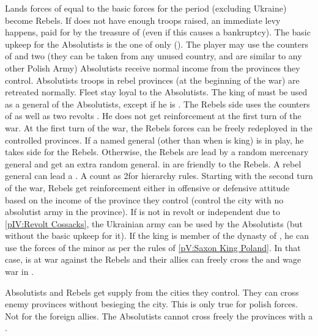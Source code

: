 \phadm
\aparag Lands forces of \POL equal to the basic forces for the period
(excluding Ukraine) become Rebels.
\bparag If \POL does not have enough troops raised, an immediate levy happens,
paid for by the treasure of \POL (even if this causes a bankruptcy).
\aparag The basic upkeep for the Absolutists is the one of \paysPologne only
(\ARMY\faceplus).
\bparag The player may use the counters of \paysPologne and two \ARMY (they
can be taken from any unused country, and are similar to any other Polish
Army)
\bparag Absolutists receive normal income from the provinces they control.
\bparag Absolutists troops in rebel provinces (at the beginning of the war)
are retreated normally.
\bparag Fleet stay loyal to the Absolutists.
\bparag The king of \POL must be used as a general of the Absolutists, except
if he is .
\aparag The Rebels side uses the counters of \paysLithuanie as well as two
revolts \ARMY.
\bparag He does not get reinforcement at the first turn of the war.
\bparag At the first turn of the war, the Rebels forces can be freely
redeployed in the controlled provinces.
\bparag If a named general (other than \leaderPatkul when 
is king) is in play, he takes side for the Rebels. Otherwise, the Rebels are
lead by a random mercenary general and get an extra random general.
\aparag \REVOLT in \POL are friendly to the Rebels.
\bparag A rebel general can lead a \REVOLT . A \REVOLT \facemoins count as
2\LD for hierarchy rules.
\aparag Starting with the second turn of the war, Rebels get reinforcement
either in offensive or defensive attitude based on the income of the province
they control (control the city with no absolutist army in the province).
\aparag If \paysukraine is not in revolt or independent due to \ref{pIV:Revolt
  Cossacks}, the Ukrainian army can be used by the Absolutists (but without
the basic upkeep for it).
\aparag If the king is member of the dynasty of \paysSaxe, he can use the
forces of the minor as per the rules of \ref{pV:Saxon King Poland}.
\bparag In that case, \paysSaxe is at war against the Rebels and their allies
can freely cross the \HRE and wage war in \paysSaxe.

\phmil
\aparag Absolutists and Rebels get supply from the cities they control.
\bparag They can cross enemy provinces without besieging the city.
\bparag This is only true for polish forces. Not for the foreign allies.
\bparag The Absolutists cannot cross freely the provinces with a \REVOLT .

